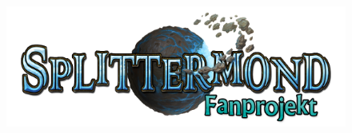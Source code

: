 \documentclass[12pt, a4paper, twoside, openany]{book}
\begin{document}
\begin{titlepage}
        {
                \begin{center}
                        \color{white}
                        \fontsize{50}{60}
                        \selectfont
                        \textbf{\MyTitle}
                \end{center}
        }%
        \begin{figure}[b]
                \centering
                \includegraphics[scale=0.8]{bilder/Splittermond-Logo_fan_v2.png}
        \end{figure}
\end{titlepage}
\clearpage
\end{document}
